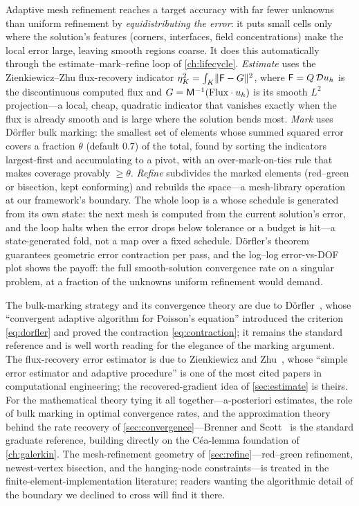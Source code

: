 \summarysection
Adaptive mesh refinement reaches a target accuracy with far fewer unknowns than
uniform refinement by \emph{equidistributing the error}: it puts small cells only
where the solution's features (corners, interfaces, field concentrations) make the
local error large, leaving smooth regions coarse. It does this automatically through
the estimate--mark--refine loop of \cref{ch:lifecycle}. \emph{Estimate} uses the
Zienkiewicz--Zhu flux-recovery indicator $\eta_K^2 = \int_K \lVert\mathsf{F} - G\rVert^2$,
where $\mathsf{F} = Q\,\mathcal{D} u_h$ is the discontinuous computed flux and $G = \mathsf{M}^{-1}(\text{Flux}\cdot u_h)$ is its smooth $L^2$ projection---a local, cheap,
quadratic indicator that vanishes exactly when the flux is already smooth and is large
where the solution bends most. \emph{Mark} uses D\"orfler bulk marking: the smallest
set of elements whose summed squared error covers a fraction $\theta$ (default $0.7$)
of the total, found by sorting the indicators largest-first and accumulating to a
pivot, with an over-mark-on-ties rule that makes coverage provably $\ge \theta$.
\emph{Refine} subdivides the marked elements (red--green or bisection, kept conforming)
and rebuilds the space---a mesh-library operation at our framework's boundary. The
whole loop is a  whose schedule is generated from its own state: the
next mesh is computed from the current solution's error, and the loop halts when the
error drops below tolerance or a budget is hit---a state-generated fold, not a map
over a fixed schedule. D\"orfler's theorem guarantees geometric error contraction per
pass, and the log--log error-vs-DOF plot shows the payoff: the full smooth-solution
convergence rate on a singular problem, at a fraction of the unknowns uniform
refinement would demand.

\furtherreading
The bulk-marking strategy and its convergence theory are due to
D\"orfler~\citep{dorfler1996}, whose ``convergent adaptive algorithm for Poisson's
equation'' introduced the criterion \cref{eq:dorfler} and proved the contraction
\cref{eq:contraction}; it remains the standard reference and is well worth reading for
the elegance of the marking argument. The flux-recovery error estimator is due to
Zienkiewicz and Zhu~\citep{zienkiewiczzhu1987}, whose ``simple error estimator and
adaptive procedure'' is one of the most cited papers in computational engineering;
the recovered-gradient idea of \cref{sec:estimate} is theirs. For the mathematical
theory tying it all together---a-posteriori estimates, the role of bulk marking in
optimal convergence rates, and the approximation theory behind the rate recovery of
\cref{sec:convergence}---Brenner and Scott~\citep{brennerscott2008} is the standard
graduate reference, building directly on the C\'ea-lemma foundation of
\cref{ch:galerkin}. The mesh-refinement geometry of \cref{sec:refine}---red--green
refinement, newest-vertex bisection, and the hanging-node constraints---is treated in
the finite-element-implementation literature; readers wanting the algorithmic detail
of the boundary we declined to cross will find it there.


